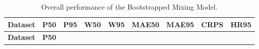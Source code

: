 \documentclass[
  12pt,
  letterpaper,
]{book}
\begin{document}
\begin{longtable}[]{@{}
  >{\centering\arraybackslash}p{}
  >{\centering\arraybackslash}p{}
  >{\centering\arraybackslash}p{}
  >{\centering\arraybackslash}p{}
  >{\centering\arraybackslash}p{}
  >{\centering\arraybackslash}p{}
  >{\centering\arraybackslash}p{}
  >{\centering\arraybackslash}p{}
  >{\centering\arraybackslash}p{}@{}}
\caption{Overall performance of the Bootstrapped Mixing
Model.}\label{tbl-bmm-performance}\tabularnewline
\toprule\noalign{}
\begin{minipage}[b]{\linewidth}\centering
\textbf{Dataset}
\end{minipage} & \begin{minipage}[b]{\linewidth}\centering
\textbf{P50}
\end{minipage} & \begin{minipage}[b]{\linewidth}\centering
\textbf{P95}
\end{minipage} & \begin{minipage}[b]{\linewidth}\centering
\textbf{W50}
\end{minipage} & \begin{minipage}[b]{\linewidth}\centering
\textbf{W95}
\end{minipage} & \begin{minipage}[b]{\linewidth}\centering
\textbf{MAE50}
\end{minipage} & \begin{minipage}[b]{\linewidth}\centering
\textbf{MAE95}
\end{minipage} & \begin{minipage}[b]{\linewidth}\centering
\textbf{CRPS}
\end{minipage} & \begin{minipage}[b]{\linewidth}\centering
\textbf{HR95}
\end{minipage} \\
\midrule\noalign{}
\endfirsthead
\toprule\noalign{}
\begin{minipage}[b]{\linewidth}\centering
\textbf{Dataset}
\end{minipage} & \begin{minipage}[b]{\linewidth}\centering
\textbf{P50}

\end{minipage}
\end{longtable}
\end{document}
